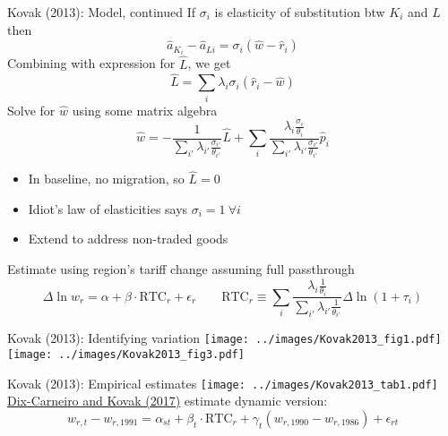 \documentclass[10pt,notes=hide]{beamer}
\begin{document}
\begin{frame}{Kovak (2013): Model, continued}
If $\sigma_i$ is elasticity of substitution btw $K_i$ and $L$ then
\begin{equation*}
\hat{a}_{K_i} - \hat{a}_{Li} = \sigma_i \left(\hat{w} - \hat{r}_i\right)
\end{equation*}
Combining with expression for $\hat{L}$, we get
\begin{equation*}
\hat{L} = \sum_i \lambda_i \sigma_i \left( \hat{r}_i - \hat{w}\right)
\end{equation*}
Solve for $\hat{w}$ using some matrix algebra
\begin{equation*}
\hat{w}
=
- \frac{1}{\sum_{i'} \lambda_{i'} \frac{\sigma_{i'}}{\theta_{i'}}} \hat{L}
+ \sum_i \frac{\lambda_{i} \frac{\sigma_{i}}{\theta_{i}}}{\sum_{i'} \lambda_{i'} \frac{\sigma_{i'}}{\theta_{i'}}} \hat{p}_i
\end{equation*}
\vspace{-3mm}
\begin{itemize}
	\item In baseline, no migration, so $\hat{L}=0$
	\item Idiot's law of elasticities says $\sigma_i =1 \ \forall i$
	\item Extend to address non-traded goods
\end{itemize}
Estimate using region's tariff change assuming full passthrough
\begin{equation*}
\Delta \ln w_{r} = \alpha + \beta \cdot \text{RTC}_r + \epsilon_r
\qquad
\text{RTC}_r\equiv \sum_i \frac{\lambda_{i} \frac{1}{\theta_{i}}}{\sum_{i'} \lambda_{i'} \frac{1}{\theta_{i'}}} \Delta \ln \left(1 + \tau_i\right)
\end{equation*}
\end{frame}
\begin{frame}{Kovak (2013): Identifying variation}
\texttt{[image: ../images/Kovak2013\_fig1.pdf]}
\texttt{[image: ../images/Kovak2013\_fig3.pdf]}
\end{frame}
\begin{frame}{Kovak (2013): Empirical estimates}
\texttt{[image: ../images/Kovak2013\_tab1.pdf]}
\href{https://www.aeaweb.org/articles?id=10.1257/aer.20161214}{Dix-Carneiro and Kovak (2017)} estimate dynamic version:
	\begin{equation*}
w_{r,t} - w_{r,\text{1991}} = \alpha_{st} + \beta_t \cdot \text{RTC}_r + \gamma_t (w_{r,\text{1990}} - w_{r,\text{1986}}) +  \epsilon_{rt}
\end{equation*}
\end{frame}
\end{document}
